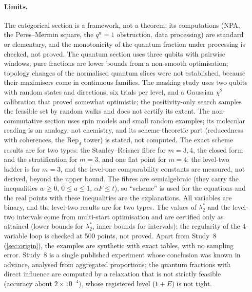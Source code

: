 \documentclass[11pt]{article}
\theoremstyle{definition}\newtheorem{definition}[theorem]{Definition}\newtheorem{remark}[theorem]{Remark}\newtheorem{example}[theorem]{Example}
\begin{document}
\paragraph{Limits.}
The categorical section is a framework, not a theorem: its computations (NPA, the Peres--Mermin square, the $q^n=1$ obstruction, data
processing) are standard or elementary, and the monotonicity of the quantum fraction under processing is checked, not proved. The quantum section uses three qubits with pairwise windows; pure
fractions are lower bounds from a non-smooth optimisation; topology changes of the normalised quantum slices were not established, because
their maximisers come in continuous families. The masking study uses two qubits with random states and directions, six trials per level, and a Gaussian $\chi^2$ calibration that proved
somewhat optimistic; the positivity-only search samples the feasible set by random walks and does not certify its extent. The non-commutative section uses spin models and small random examples; its molecular reading is an analogy, not chemistry, and its
scheme-theoretic part (reducedness with coherences, the $\mathrm{Rep}_d$ tower) is stated, not computed. The exact scheme results are for two types: the Stanley--Reisner fibre for $m=3,4$, the closed form and the stratification for $m=3$, and
one flat point for $m=4$; the level-two ladder is for $m=3$, and the level-one comparability constants are measured, not derived, beyond
the upper bound. The fibres are semialgebraic (they carry the inequalities $w\ge0$, $0\le a\le1$, $\alpha F\le t$), so ``scheme'' is used for the
equations and the real points with these inequalities are the explanations. All variables are binary, and the level-two results are for
two types. The values of $\lambda_2^*$ and the level-two intervals come from multi-start optimisation and are certified only as
attained (lower bounds for $\lambda^*_2$, inner bounds for intervals); the regularity of the 4-variable loop is checked at 500 points,
not proved. Apart from Study~8 (\cref{sec:origin}), the examples are synthetic with exact tables, with no sampling error. Study~8 is a single published experiment whose conclusion was known in advance, analysed from aggregated proportions; the quantum fractions with direct influence are computed by a relaxation that is not strictly feasible (accuracy about $2\times10^{-4}$), whose registered level ($1{+}E$) is not tight.
\end{document}
